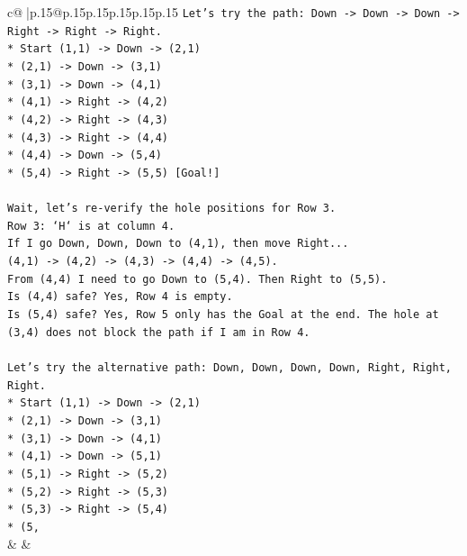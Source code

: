 \documentclass{article}
\begin{document}
{\begin{supertabular}{c@{$\;$}|p{.15\linewidth}@{}p{.15\linewidth}p{.15\linewidth}p{.15\linewidth}p{.15\linewidth}p{.15\linewidth}}
{{{\texttt{Let's try the path: Down {-}> Down {-}> Down {-}> Right {-}> Right {-}> Right.} \\
\texttt{*   Start (1,1) {-}> Down {-}> (2,1)} \\
\texttt{*   (2,1) {-}> Down {-}> (3,1)} \\
\texttt{*   (3,1) {-}> Down {-}> (4,1)} \\
\texttt{*   (4,1) {-}> Right {-}> (4,2)} \\
\texttt{*   (4,2) {-}> Right {-}> (4,3)} \\
\texttt{*   (4,3) {-}> Right {-}> (4,4)} \\
\texttt{*   (4,4) {-}> Down {-}> (5,4)} \\
\texttt{*   (5,4) {-}> Right {-}> (5,5) {[}Goal!{]}} \\
\\ 
\texttt{Wait, let's re{-}verify the hole positions for Row 3.} \\
\texttt{Row 3: `H` is at column 4.} \\
\texttt{If I go Down, Down, Down to (4,1), then move Right...} \\
\texttt{(4,1) {-}> (4,2) {-}> (4,3) {-}> (4,4) {-}> (4,5).} \\
\texttt{From (4,4) I need to go Down to (5,4). Then Right to (5,5).} \\
\texttt{Is (4,4) safe? Yes, Row 4 is empty.} \\
\texttt{Is (5,4) safe? Yes, Row 5 only has the Goal at the end. The hole at (3,4) does not block the path if I am in Row 4.} \\
\\ 
\texttt{Let's try the alternative path: Down, Down, Down, Down, Right, Right, Right.} \\
\texttt{*   Start (1,1) {-}> Down {-}> (2,1)} \\
\texttt{*   (2,1) {-}> Down {-}> (3,1)} \\
\texttt{*   (3,1) {-}> Down {-}> (4,1)} \\
\texttt{*   (4,1) {-}> Down {-}> (5,1)} \\
\texttt{*   (5,1) {-}> Right {-}> (5,2)} \\
\texttt{*   (5,2) {-}> Right {-}> (5,3)} \\
\texttt{*   (5,3) {-}> Right {-}> (5,4)} \\
\texttt{*   (5,} \\
            }
        }
    }
    & & \\ \\


\end{supertabular}}
\end{document}
